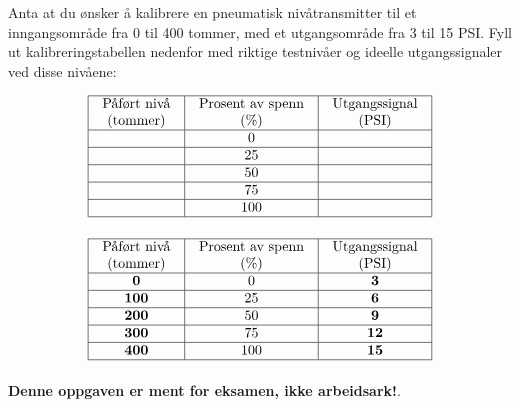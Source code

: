 

Anta at du ønsker å kalibrere en pneumatisk nivåtransmitter til et inngangsområde fra 0 til 400 tommer, med et utgangsområde fra 3 til 15 PSI. Fyll ut kalibreringstabellen nedenfor med riktige testnivåer og ideelle utgangssignaler ved disse nivåene:


$$\vbox{\offinterlineskip
\halign{\strut
\vrule \quad\hfil # \ \hfil & 
\vrule \quad\hfil # \ \hfil & 
\vrule \quad\hfil # \ \hfil \vrule \cr
\noalign{\hrule}
%
Påført nivå & Prosent av spenn & Utgangssignal \cr
%
(tommer) & (\%) & (PSI) \cr
%
\noalign{\hrule}
%
 & 0 &  \cr
%
\noalign{\hrule}
%
 & 25 &  \cr
%
\noalign{\hrule}
%
 & 50 &  \cr
%
\noalign{\hrule}
%
 & 75 &  \cr
%
\noalign{\hrule}
%
 & 100 &  \cr
%
\noalign{\hrule}
} %
}$$ %








$$\vbox{\offinterlineskip
\halign{\strut
\vrule \quad\hfil # \ \hfil & 
\vrule \quad\hfil # \ \hfil & 
\vrule \quad\hfil # \ \hfil \vrule \cr
\noalign{\hrule}
%
Påført nivå & Prosent av spenn & Utgangssignal \cr
%
(tommer) & (\%) & (PSI) \cr
%
\noalign{\hrule}
%
{\bf 0} & 0 & {\bf 3} \cr
%
\noalign{\hrule}
%
{\bf 100} & 25 & {\bf 6} \cr
%
\noalign{\hrule}
%
{\bf 200} & 50 & {\bf 9} \cr
%
\noalign{\hrule}
%
{\bf 300} & 75 & {\bf 12} \cr
%
\noalign{\hrule}
%
{\bf 400} & 100 & {\bf 15} \cr
%
\noalign{\hrule}
} %
}$$ %







{\bf Denne oppgaven er ment for eksamen, ikke arbeidsark!}.


